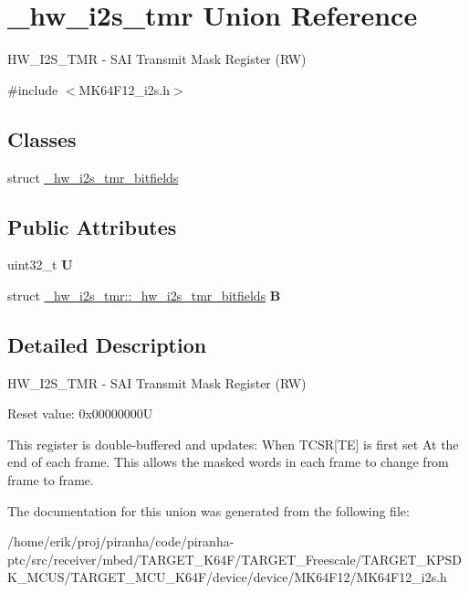 \hypertarget{union__hw__i2s__tmr}{}\section{\+\_\+hw\+\_\+i2s\+\_\+tmr Union Reference}
\label{union__hw__i2s__tmr}


H\+W\+\_\+\+I2\+S\+\_\+\+T\+MR -\/ S\+AI Transmit Mask Register (RW)  




{\ttfamily \#include $<$M\+K64\+F12\+\_\+i2s.\+h$>$}

\subsection*{Classes}
\begin{DoxyCompactItemize}
\item 
struct \hyperlink{struct__hw__i2s__tmr_1_1__hw__i2s__tmr__bitfields}{\+\_\+hw\+\_\+i2s\+\_\+tmr\+\_\+bitfields}
\end{DoxyCompactItemize}
\subsection*{Public Attributes}
\begin{DoxyCompactItemize}
\item 
uint32\+\_\+t {\bfseries U}\hypertarget{union__hw__i2s__tmr_af491c2daf3f57b742eeb3b7f3293c110}{}\label{union__hw__i2s__tmr_af491c2daf3f57b742eeb3b7f3293c110}

\item 
struct \hyperlink{struct__hw__i2s__tmr_1_1__hw__i2s__tmr__bitfields}{\+\_\+hw\+\_\+i2s\+\_\+tmr\+::\+\_\+hw\+\_\+i2s\+\_\+tmr\+\_\+bitfields} {\bfseries B}\hypertarget{union__hw__i2s__tmr_a10587104f1544b07bc1d8ee5da35dad9}{}\label{union__hw__i2s__tmr_a10587104f1544b07bc1d8ee5da35dad9}

\end{DoxyCompactItemize}


\subsection{Detailed Description}
H\+W\+\_\+\+I2\+S\+\_\+\+T\+MR -\/ S\+AI Transmit Mask Register (RW) 

Reset value\+: 0x00000000U

This register is double-\/buffered and updates\+: When T\+C\+SR\mbox{[}TE\mbox{]} is first set At the end of each frame. This allows the masked words in each frame to change from frame to frame. 

The documentation for this union was generated from the following file\+:\begin{DoxyCompactItemize}
\item 
/home/erik/proj/piranha/code/piranha-\/ptc/src/receiver/mbed/\+T\+A\+R\+G\+E\+T\+\_\+\+K64\+F/\+T\+A\+R\+G\+E\+T\+\_\+\+Freescale/\+T\+A\+R\+G\+E\+T\+\_\+\+K\+P\+S\+D\+K\+\_\+\+M\+C\+U\+S/\+T\+A\+R\+G\+E\+T\+\_\+\+M\+C\+U\+\_\+\+K64\+F/device/device/\+M\+K64\+F12/M\+K64\+F12\+\_\+i2s.\+h\end{DoxyCompactItemize}

